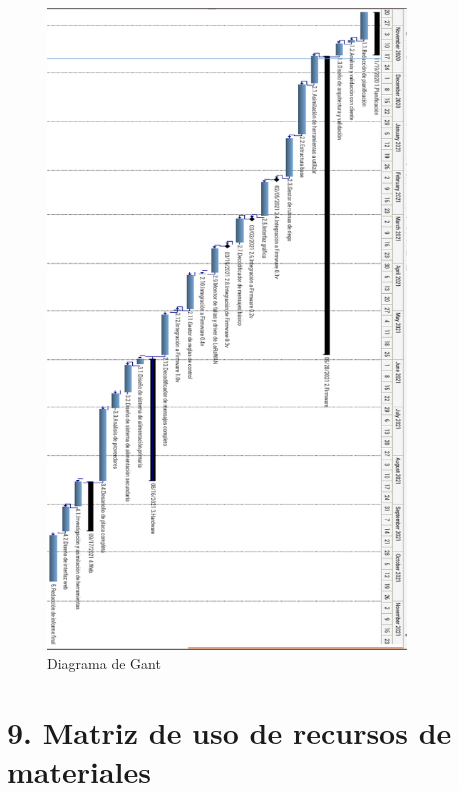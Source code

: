 \documentclass[11pt]{charter}
\begin{document}
\begin{figure}[htpb]
\centering
\includegraphics[width=0.85\textwidth]{./Figuras/gantG.png}
\caption{Diagrama de Gant}
\label{fig:redLoRa}
\end{figure}

\section{9. Matriz de uso de recursos de materiales}
\label{sec:recursos}
\end{document}
